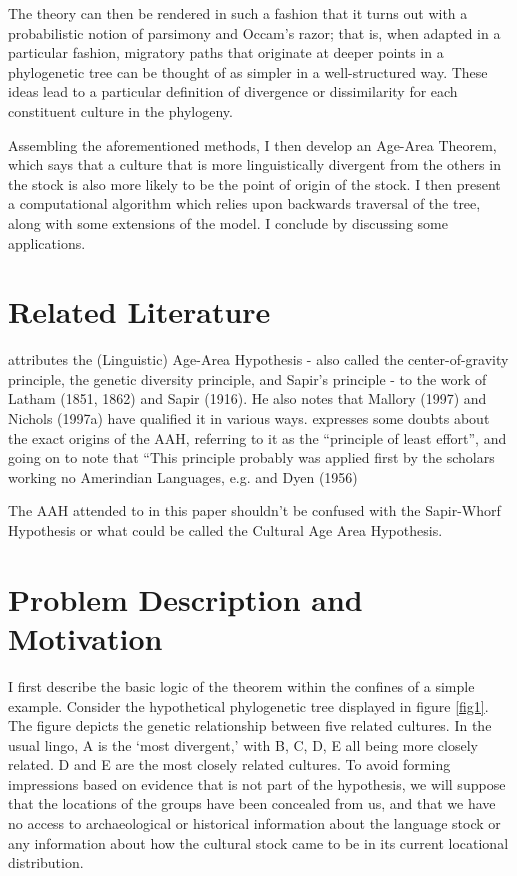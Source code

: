 \documentclass[11pt]{article}
\begin{document}
The theory can then be rendered in such a fashion that it turns out with a probabilistic notion of parsimony and Occam's razor; that is, when adapted in a particular fashion, migratory paths that originate at deeper points in a phylogenetic tree can be thought of as simpler in a well-structured way.  These ideas lead to a particular definition of divergence or dissimilarity for each constituent culture in the phylogeny. 

Assembling the aforementioned methods, I then develop an Age-Area Theorem, which says that a culture that is more linguistically divergent from the others in the stock is also more likely to be the point of origin of the stock. I then present a computational algorithm which relies upon backwards traversal of the tree, along with some extensions of the model. I conclude by discussing some applications.

\section{Related Literature}

\cite[p.12]{trask00} attributes the (Linguistic) Age-Area Hypothesis - also called the center-of-gravity principle, the genetic diversity principle, and Sapir's principle - to the work of Latham (1851, 1862) and Sapir (1916). He also notes that Mallory (1997) and Nichols (1997a) have qualified it in various ways.   \citet[p.336]{dimmendaal11} expresses some doubts about the exact origins of the AAH, referring to it as the ``principle of least effort'', and going on to note that ``This principle probably was applied first by the scholars working no Amerindian Languages, e.g. \cite{sapir16} and Dyen (1956)

The AAH attended to in this paper shouldn't be confused with the Sapir-Whorf Hypothesis or what could be called the Cultural Age Area Hypothesis. 



\section{Problem Description and Motivation}

I first describe the basic logic of the theorem within the confines of a simple example. Consider the hypothetical phylogenetic tree displayed in figure \ref{fig1}. The figure depicts the genetic relationship between five related cultures.  In the usual lingo, A is the `most divergent,' with B, C, D, E all being more closely related. D and E are the most closely related cultures. To avoid forming impressions based on evidence that is not part of the hypothesis, we will suppose that the locations of the
groups have been concealed from us, and that we have no access to archaeological or historical information about the language stock or any information about how the cultural stock came to be in its current locational distribution.
\end{document}
